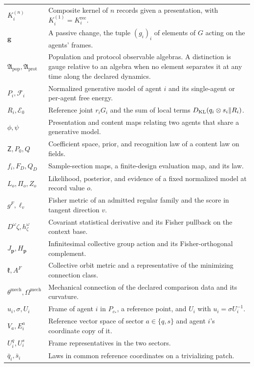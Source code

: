 \begin{longtable}{@{}p{}p{}@{}}
$K_i^{(n)}$ & Composite kernel of $n$ records given a presentation, with $K_i^{(1)}=K_i^{\mathrm{rec}}$. \\
$\mathbf g$ & A passive change, the tuple $(g_i)_i$ of elements of $G$ acting on the agents' frames. \\
$\mathfrak A_{\mathrm{pop}},\mathfrak A_{\mathrm{prot}}$ & Population and protocol observable algebras. A distinction is gauge relative to an algebra when no element separates it at any time along the declared dynamics. \\
$P_i,\mathcal F_i$ & Normalized generative model of agent $i$ and its single-agent or per-agent free energy. \\
$R_i,\mathcal E_0$ & Reference joint $r_iG_i$ and the sum of local terms $D_{\mathrm{KL}}(q_i\otimes s_i\Vert R_i)$. \\
$\phi,\psi$ & Presentation and content maps relating two agents that share a generative model. \\
$\mathsf Z,P_0,Q$ & Coefficient space, prior, and recognition law of a content law on fields. \\
$f_i,F_D,Q_D$ & Sample-section maps, a finite-design evaluation map, and its law. \\
$L_o,\Pi_o,Z_o$ & Likelihood, posterior, and evidence of a fixed normalized model at record value $o$. \\
$g^F,\ell_v$ & Fisher metric of an admitted regular family and the score in tangent direction $v$. \\
$D^\omega\zeta,h^\omega_\zeta$ & Covariant statistical derivative and its Fisher pullback on the context base. \\
$J_{\boldsymbol p},H_{\boldsymbol p}$ & Infinitesimal collective group action and its Fisher-orthogonal complement. \\
$\mathfrak k,A^F$ & Collective orbit metric and a representative of the minimizing connection class. \\
$\theta^{\mathrm{mech}},\Omega^{\mathrm{mech}}$ & Mechanical connection of the declared comparison data and its curvature. \\
$u_i,\sigma,U_i$ & Frame of agent $i$ in $P_{c_*}$, a reference point, and $U_i$ with $u_i=\sigma U_i^{-1}$. \\
$V_a,E_i^a$ & Reference vector space of sector $a\in\{q,s\}$ and agent $i$'s coordinate copy of it. \\
$U_i^q,U_i^s$ & Frame representatives in the two sectors. \\
$\bar q_i,\bar s_i$ & Laws in common reference coordinates on a trivializing patch. \\

\end{longtable}
